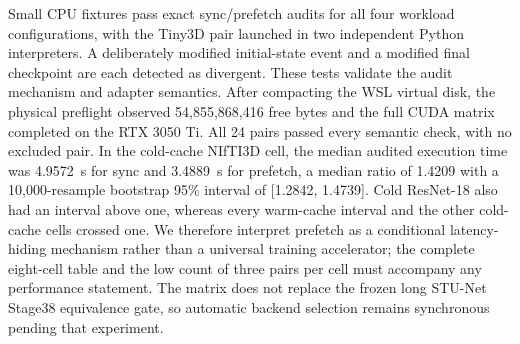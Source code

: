 Small CPU fixtures pass exact sync/prefetch audits for all four
workload configurations, with the Tiny3D pair launched in two independent
Python interpreters. A deliberately modified initial-state event and a modified
final checkpoint are each detected as divergent. These tests validate the audit
mechanism and adapter semantics. After compacting the WSL virtual disk, the
physical preflight observed 54,855,868,416 free bytes and the full CUDA matrix
completed on the RTX 3050 Ti. All 24 pairs passed every semantic check, with no
excluded pair. In the cold-cache NIfTI3D cell, the median audited execution time
was 4.9572~s for sync and 3.4889~s for prefetch, a median ratio of 1.4209 with a
10,000-resample bootstrap 95\% interval of [1.2842, 1.4739]. Cold ResNet-18
also had an interval above one, whereas every warm-cache interval and the other
cold-cache cells crossed one. We therefore interpret prefetch as a conditional
latency-hiding mechanism rather than a universal training accelerator; the
complete eight-cell table and the low count of three pairs per cell must
accompany any performance statement. The matrix does not replace the frozen
long STU-Net Stage38 equivalence gate, so automatic backend selection remains
synchronous pending that experiment.
